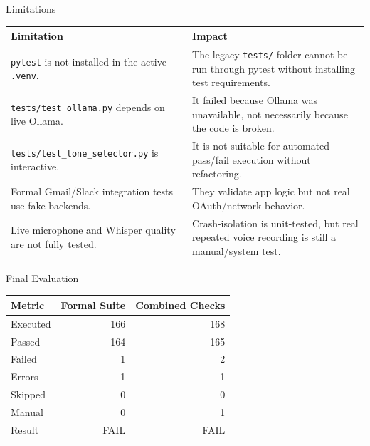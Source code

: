 \begin{frame}{Limitations}
\scriptsize
\begin{tabular}{p{}p{}}
\hline
\textbf{Limitation} & \textbf{Impact}\\
\hline
\texttt{pytest} is not installed in the active \texttt{.venv}. & The legacy \texttt{tests/} folder cannot be run through pytest without installing test requirements.\\
\texttt{tests/test\_ollama.py} depends on live Ollama. & It failed because Ollama was unavailable, not necessarily because the code is broken.\\
\texttt{tests/test\_tone\_selector.py} is interactive. & It is not suitable for automated pass/fail execution without refactoring.\\
Formal Gmail/Slack integration tests use fake backends. & They validate app logic but not real OAuth/network behavior.\\
Live microphone and Whisper quality are not fully tested. & Crash-isolation is unit-tested, but real repeated voice recording is still a manual/system test.\\
\hline
\end{tabular}
\end{frame}

\begin{frame}{Final Evaluation}
\small
\begin{tabular}{lrr}
\hline
\textbf{Metric} & \textbf{Formal Suite} & \textbf{Combined Checks}\\
\hline
Executed & 166 & 168\\
Passed & 164 & 165\\
Failed & 1 & 2\\
Errors & 1 & 1\\
Skipped & 0 & 0\\
Manual & 0 & 1\\
\hline
Result & FAIL & FAIL\\
\hline
\end{tabular}
\end{frame}
